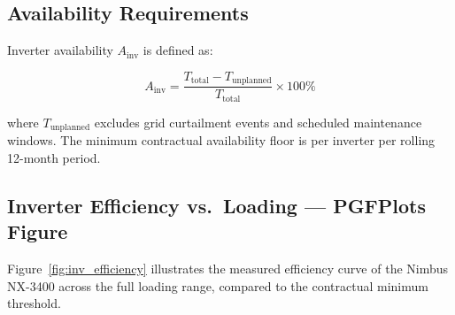 \subsection{Availability Requirements}

Inverter availability $A_{\text{inv}}$ is defined as:

\[
  A_{\text{inv}} = \frac{T_{\text{total}} - T_{\text{unplanned}}}{T_{\text{total}}} \times 100\%
\]

where $T_{\text{unplanned}}$ excludes grid curtailment events and scheduled maintenance windows.
The minimum contractual availability floor is  per inverter per
rolling 12-month period.

\begin{minipage}[t]{0.47\linewidth}
\end{minipage}%
\hfill%
\begin{minipage}[t]{0.47\linewidth}
\end{minipage}

\subsection{Inverter Efficiency vs.\ Loading — PGFPlots Figure}

Figure~\ref{fig:inv_efficiency} illustrates the measured efficiency curve of the Nimbus NX-3400
across the full loading range, compared to the contractual minimum threshold.

